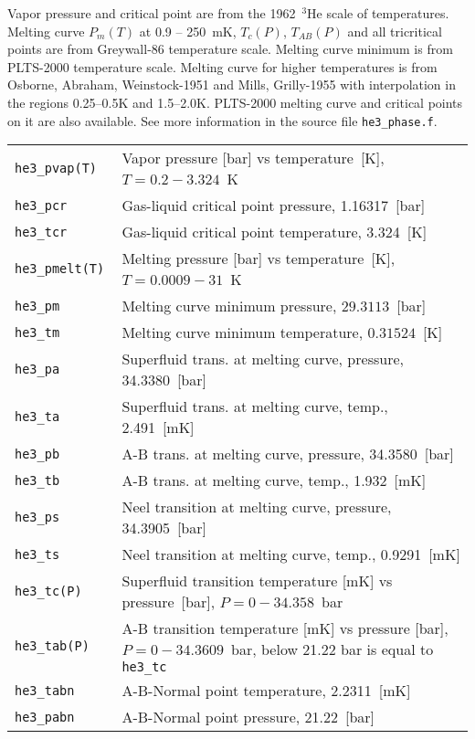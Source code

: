 \documentclass[a4paper]{article}
\begin{document}
Vapor pressure and critical point are from the {1962~$^3$He scale of
temperatures}. Melting curve $P_m(T)$ at 0.9 -- 250~mK, $T_c(P)$,
$T_{AB}(P)$ and all tricritical points are from {Greywall-86 temperature
scale}. Melting curve minimum is from PLTS-2000 temperature scale.
Melting curve for higher temperatures is from {Osborne, Abraham, Weinstock-1951} and {Mills, Grilly-1955} with
interpolation in the regions 0.25--0.5K and 1.5--2.0K. PLTS-2000 melting
curve and critical points on it are also available. See more information
in the source file {\tt he3\_phase.f}.

\medskip
\noindent\begin{tabular}{lp{11cm}}
\tt he3\_pvap(T)  & Vapor pressure [bar] vs temperature~[K],\newline
                    $ T = 0.2 - 3.324$~K \\
\tt he3\_pcr      & Gas-liquid critical point pressure, 1.16317~[bar] \\
\tt he3\_tcr      & Gas-liquid critical point temperature, 3.324~[K] \\
\tt he3\_pmelt(T) & Melting pressure [bar] vs temperature~[K],\newline
                    $ T = 0.0009 - 31$~K\\
\tt he3\_pm       & Melting curve minimum pressure, $29.3113$~[bar]\\
\tt he3\_tm       & Melting curve minimum temperature, $0.31524$~[K]\\
\tt he3\_pa       & Superfluid trans. at melting curve, pressure, 34.3380~[bar]\\
\tt he3\_ta       & Superfluid trans. at melting curve, temp., 2.491~[mK]\\
\tt he3\_pb       & A-B trans. at melting curve, pressure, 34.3580~[bar]\\
\tt he3\_tb       & A-B trans. at melting curve, temp., 1.932~[mK]\\
\tt he3\_ps       & Neel transition at melting curve, pressure, 34.3905~[bar]\\
\tt he3\_ts       & Neel transition at melting curve, temp., 0.9291~[mK]\\
\tt he3\_tc(P)    & Superfluid transition temperature [mK] vs pressure~[bar],\newline
                    $ P = 0 - 34.358 $~bar\\
\tt he3\_tab(P)   & A-B transition temperature [mK] vs pressure [bar],\newline
                    $ P = 0 - 34.3609 $~bar, below 21.22 bar is equal to {\tt he3\_tc}\\
\tt he3\_tabn     & A-B-Normal point temperature, 2.2311~[mK]\\
\tt he3\_pabn     & A-B-Normal point pressure, 21.22~[bar]\\
\end{tabular}
\medskip
\end{document}
